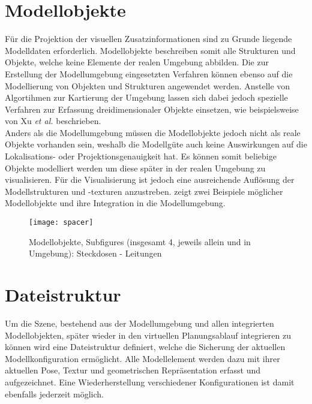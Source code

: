 \section{Modellobjekte}
Für die Projektion der visuellen Zusatzinformationen sind zu Grunde liegende Modelldaten erforderlich. Modellobjekte beschreiben somit alle Strukturen und Objekte, welche keine Elemente der realen Umgebung abbilden. Die zur Erstellung der Modellumgebung eingesetzten Verfahren können ebenso auf die Modellierung von Objekten und Strukturen angewendet werden. Anstelle von Algortihmen zur Kartierung der Umgebung lassen sich dabei jedoch spezielle Verfahren zur Erfassung dreidimensionaler Objekte einsetzen, wie beispielsweise von Xu \textit{et al.} \cite{Xu2012} beschrieben.\\

Anders als die Modellumgebung müssen die Modellobjekte jedoch nicht als reale Objekte vorhanden sein, weshalb die Modellgüte auch keine Auswirkungen auf die Lokalisations- oder Projektionsgenauigkeit hat. Es können somit beliebige Objekte modelliert werden um diese später in der realen Umgebung zu visualisieren.  Für die Visualisierung ist jedoch eine ausreichende Auflösung der Modellstrukturen und -texturen anzustreben.  zeigt zwei Beispiele möglicher Modellobjekte und ihre Integration in die Modellumgebung.\\

\begin{figure}[ht]
	\begin{center}
		\texttt{[image: spacer]}
		\caption{Modellobjekte, Subfigures (insgesamt 4, jeweils allein und in Umgebung): Steckdosen - Leitungen}
		\label{fig.modobj}
	\end{center}
\end{figure}

\section{Dateistruktur}
Um die Szene, bestehend aus der Modellumgebung und allen integrierten Modellobjekten, später wieder in den virtuellen Planungsablauf integrieren zu können wird eine Dateistruktur definiert, welche die Sicherung der aktuellen Modellkonfiguration ermöglicht. Alle Modellelement werden dazu mit ihrer aktuellen Pose, Textur und geometrischen Repräsentation erfasst und aufgezeichnet. Eine Wiederherstellung verschiedener Konfigurationen ist damit ebenfalls jederzeit möglich.\\
